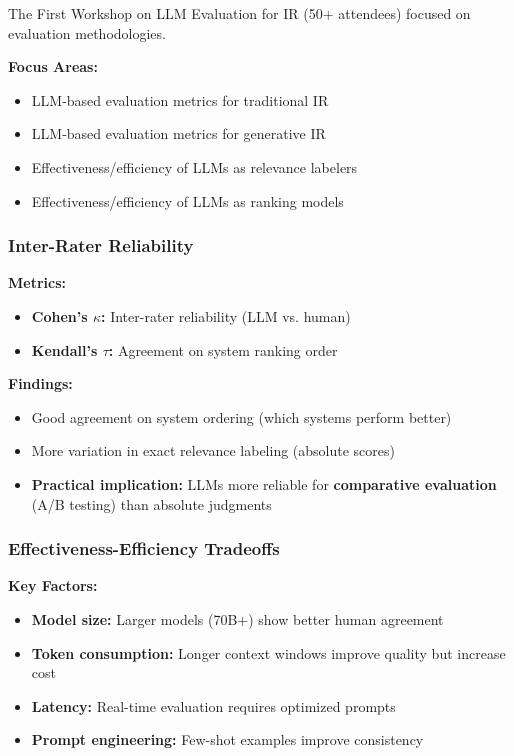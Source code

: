 \documentclass[11pt,letterpaper]{article}
\begin{document}
The First Workshop on LLM Evaluation for IR (50+ attendees) focused on evaluation methodologies.

\textbf{Focus Areas:}
\begin{itemize}[leftmargin=*]
    \item LLM-based evaluation metrics for traditional IR
    \item LLM-based evaluation metrics for generative IR
    \item Effectiveness/efficiency of LLMs as relevance labelers
    \item Effectiveness/efficiency of LLMs as ranking models
\end{itemize}

\subsubsection{Inter-Rater Reliability}

\textbf{Metrics:}
\begin{itemize}[leftmargin=*]
    \item \textbf{Cohen's $\kappa$:} Inter-rater reliability (LLM vs. human)
    \item \textbf{Kendall's $\tau$:} Agreement on system ranking order
\end{itemize}

\textbf{Findings:}
\begin{itemize}[leftmargin=*]
    \item Good agreement on system ordering (which systems perform better)
    \item More variation in exact relevance labeling (absolute scores)
    \item \textbf{Practical implication:} LLMs more reliable for \textbf{comparative evaluation} (A/B testing) than absolute judgments
\end{itemize}

\subsubsection{Effectiveness-Efficiency Tradeoffs}

\textbf{Key Factors:}
\begin{itemize}[leftmargin=*]
    \item \textbf{Model size:} Larger models (70B+) show better human agreement
    \item \textbf{Token consumption:} Longer context windows improve quality but increase cost
    \item \textbf{Latency:} Real-time evaluation requires optimized prompts
    \item \textbf{Prompt engineering:} Few-shot examples improve consistency
\end{itemize}
\end{document}
